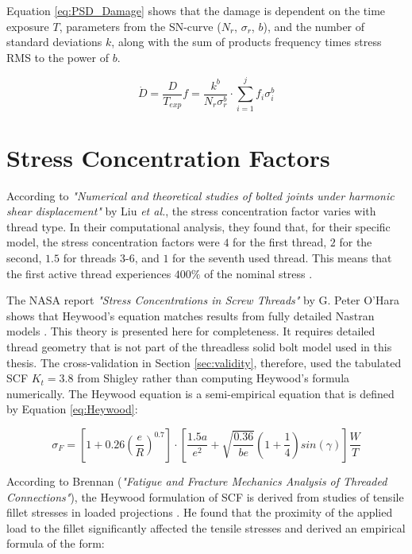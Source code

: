 \documentclass[a4paper,twoside]{bth}
\begin{document}
Equation \ref{eq:PSD_Damage} shows that the damage is dependent on the time exposure $T$, parameters from the SN-curve ($N_r$, $\sigma_r$, $b$), and the number of standard deviations $k$, along with the sum of products frequency times stress \ac{RMS} to the power of $b$.

\begin{equation}
    \dot{D} = \frac{D}{T_{exp}} f= \frac{k^b}{N_r\sigma_r^b}\cdot \sum_{i=1}^j f_i\sigma_i^b
\end{equation}

\section{Stress Concentration Factors} \label{sec:SCF}

According to \textit{"Numerical and theoretical studies of bolted joints under harmonic shear displacement"} by Liu \textit{et al.}, the stress concentration factor varies with thread type. In their computational analysis, they found that, for their specific model, the stress concentration factors were $4$ for the first thread, $2$ for the second, $1.5$ for threads 3-6, and $1$ for the seventh used thread. This means that the first active thread experiences $400 \%$ of the nominal stress \cite{liu_numerical_2015}.


The NASA report \textit{"Stress Concentrations in Screw Threads"} by G. Peter O'Hara shows that Heywood's equation matches results from fully detailed Nastran models \cite{ohara_stress_nodate}. This theory is presented here for completeness. It requires detailed thread geometry that is not part of the threadless solid bolt model used in this thesis. The cross-validation in Section \ref{sec:validity}, therefore, used the tabulated \ac{SCF} $K_t = 3.8$ from Shigley rather than computing Heywood's formula numerically. The Heywood equation is a semi-empirical equation that is defined by Equation \ref{eq:Heywood}:

\begin{equation} \label{eq:Heywood}
    \sigma_F = \left[1 + 0.26\left(\frac{e}{R}\right)^{0.7}\right]\cdot \left[ \frac{1.5a}{e^2} + \sqrt{\frac{0.36}{be}} (1+\frac{1}{4})sin(\gamma) \right] \frac{W}{T}
\end{equation}

According to Brennan (\textit{"Fatigue and Fracture Mechanics Analysis of Threaded Connections"}), the Heywood formulation of \ac{SCF} is derived from studies of tensile fillet stresses in loaded projections \cite{brennan_fatigue_nodate}. He found that the proximity of the applied load to the fillet significantly affected the tensile stresses and derived an empirical formula of the form:
\end{document}
